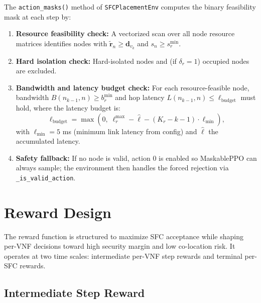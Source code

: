 The \texttt{action\_masks()} method of \texttt{SFCPlacementEnv} computes the binary feasibility mask at each step by:
\begin{enumerate}
  \item \textbf{Resource feasibility check:} A vectorized scan over all node resource matrices identifies nodes with $\tilde{\mathbf{r}}_n \geq \mathbf{d}_{v_k}$ and $s_n \geq s_r^{\min}$.
  \item \textbf{Hard isolation check:} Hard-isolated nodes and (if $\delta_r = 1$) occupied nodes are excluded.
  \item \textbf{Bandwidth and latency budget check:} For each resource-feasible node, bandwidth $B(n_{k-1}, n) \geq b_r^{\min}$ and hop latency $L(n_{k-1}, n) \leq \ell_{\text{budget}}$ must hold, where the latency budget is:
  \begin{equation}
  \ell_{\text{budget}} = \max\!\left(0,\; \ell_r^{\max} - \hat{\ell} - (K_r - k - 1) \cdot \ell_{\min}\right),
  \end{equation}
  with $\ell_{\min} = 5$ ms (minimum link latency from config) and $\hat{\ell}$ the accumulated latency.
  \item \textbf{Safety fallback:} If no node is valid, action 0 is enabled so MaskablePPO can always sample; the environment then handles the forced rejection via \texttt{\_is\_valid\_action}.
\end{enumerate}

\section{Reward Design}

The reward function is structured to maximize SFC acceptance while shaping per-VNF decisions toward high security margin and low co-location risk. It operates at two time scales: intermediate per-VNF step rewards and terminal per-SFC rewards.

\subsection{Intermediate Step Reward}

